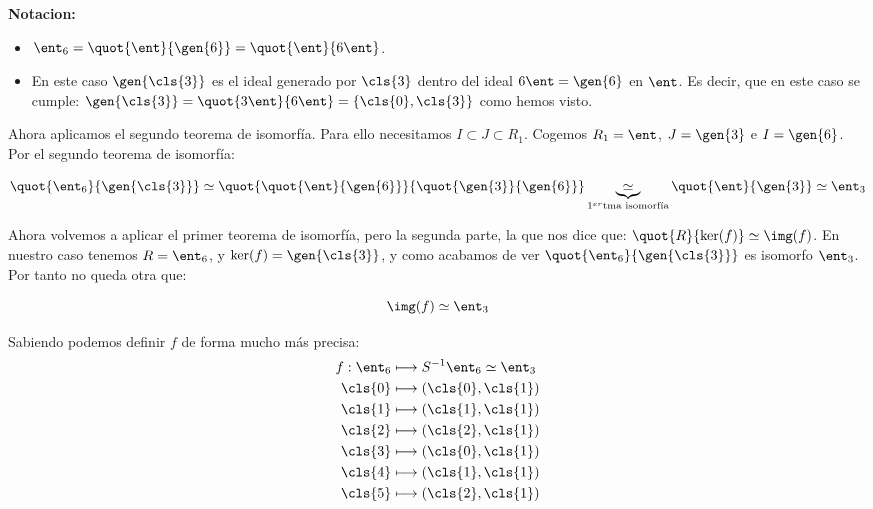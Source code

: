 \begin{example}
	\textbf{Notacion:} 
	\begin{itemize}
		\item $\ent_6 = \quot{\ent}{\gen{6}}= \quot{\ent}{6 \ent}$.
		\item En este caso $\gen{\cls{3}}$ es el ideal generado por $\cls{3}$ dentro del ideal $6\ent=\gen{6}$ en $\ent$. Es decir, que en este caso se cumple: $\gen{\cls{3}}=\quot{3\ent}{6\ent} = \{ \cls{0}, \cls{3}\}$ como hemos visto.
	\end{itemize}
	
	Ahora aplicamos el segundo teorema de isomorfía. Para ello necesitamos $I \subset J \subset R_1$. Cogemos $R_1 = \ent$, $J=\gen{3}$ e $I=\gen{6}$. Por el segundo teorema de isomorfía:
	
	$$ \quot{\ent_6}{\gen{\cls{3}}} \simeq \quot{\quot{\ent}{\gen{6}}}{\quot{\gen{3}}{\gen{6}}} \underbrace{\simeq}_{1^{er} \text{tma isomorfía} } \quot{\ent}{\gen{3}} \simeq \ent_3$$ 
	
	Ahora volvemos a aplicar el primer teorema de isomorfía, pero la segunda parte, la que nos dice que: $\quot{R}{\ker(f)} \simeq \img(f)$. En nuestro caso tenemos $R=\ent_6$, y $\ker(f)=\gen{\cls{3}}$, y como acabamos de ver  $\quot{\ent_6}{\gen{\cls{3}}}$ es isomorfo $\ent_3$. Por tanto no queda otra que:
	
	$$\img(f) \simeq \ent_3$$
	
	Sabiendo podemos definir $f$ de forma mucho más precisa:
	\begin{align*}
		f: \ent_6 & \longmapsto  S^{-1}\ent_6 \simeq \ent_3\\
		\cls{0} & \longmapsto (\cls{0},\cls{1}) \\
		\cls{1} & \longmapsto (\cls{1},\cls{1}) \\
		\cls{2} & \longmapsto (\cls{2},\cls{1}) \\
		\cls{3} & \longmapsto (\cls{0},\cls{1}) \\
		\cls{4} & \longmapsto (\cls{1},\cls{1}) \\
		\cls{5} & \longmapsto (\cls{2},\cls{1}) \\
	\end{align*}
	

\end{example}
